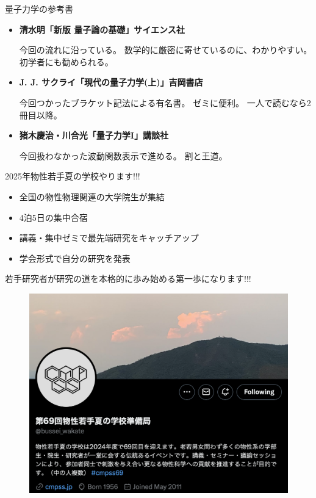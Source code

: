 \documentclass[dvipdfm]{beamer}
\begin{document}
\begin{frame}{量子力学の参考書}
    \begin{itemize}
        \item \textbf{清水明「新版 量子論の基礎」サイエンス社}

        今回の流れに沿っている。
        数学的に厳密に寄せているのに、わかりやすい。
        初学者にも勧められる。
        \item \textbf{J. J. サクライ「現代の量子力学(上)」吉岡書店}

        今回つかったブラケット記法による有名書。
        ゼミに便利。
        一人で読むなら2冊目以降。
        \item \textbf{猪木慶治・川合光「量子力学I」講談社}

        今回扱わなかった波動関数表示で進める。
        割と王道。
    \end{itemize}
\end{frame}

\begin{frame}{2025年物性若手夏の学校やります!!!}
    \begin{itemize}
        \item 全国の物性物理関連の大学院生が集結
        \item 4泊5日の集中合宿
        \item 講義・集中ゼミで最先端研究をキャッチアップ
        \item 学会形式で自分の研究を発表
    \end{itemize}
    若手研究者が研究の道を本格的に歩み始める第一歩になります!!!

    \textbf{}

    \begin{figure}
        \centering
        \includegraphics[width=0.6\linewidth]{bussei-tweet.png}
    \end{figure}
\end{frame}
\end{document}
